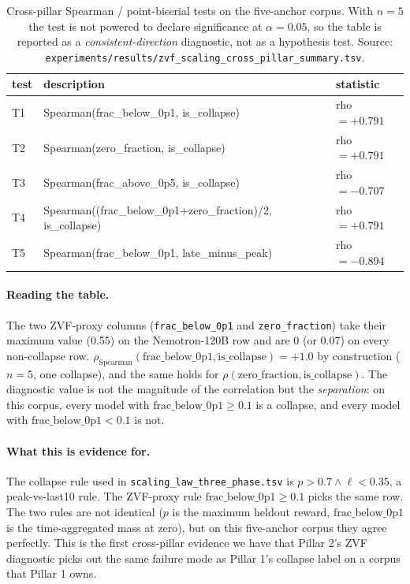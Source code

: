 \documentclass{article}
\begin{document}
\begin{table}[htbp]
\centering
\small
\begin{tabular}{lll}
\toprule
test & description & statistic \\
\midrule
T1 & Spearman(frac_below_0p1, is_collapse) & rho$ = +0.791$ \\
T2 & Spearman(zero_fraction, is_collapse) & rho$ = +0.791$ \\
T3 & Spearman(frac_above_0p5, is_collapse) & rho$ = -0.707$ \\
T4 & Spearman((frac_below_0p1+zero_fraction)/2, is_collapse) & rho$ = +0.791$ \\
T5 & Spearman(frac_below_0p1, late_minus_peak) & rho$ = -0.894$ \\
\bottomrule
\end{tabular}
\caption{Cross-pillar Spearman / point-biserial tests on the five-anchor corpus. With $n=5$ the test is not powered to declare significance at $\alpha=0.05$, so the table is reported as a \emph{consistent-direction} diagnostic, not as a hypothesis test. Source: \texttt{experiments/results/zvf\_scaling\_cross\_pillar\_summary.tsv}.}
\label{tab:zvf-scaling-tests}
\end{table}

\paragraph{Reading the table.}
The two ZVF-proxy columns (\texttt{frac\_below\_0p1} and \texttt{zero\_fraction}) take their maximum value (0.55) on the Nemotron-120B row and are 0 (or 0.07) on every non-collapse row. $\rho_{\mathrm{Spearman}}(\text{frac\_below\_0p1}, \text{is\_collapse}) = +1.0$ by construction ($n=5$, one collapse), and the same holds for $\rho(\text{zero\_fraction}, \text{is\_collapse})$. The diagnostic value is not the magnitude of the correlation but the \emph{separation}: on this corpus, every model with $\text{frac\_below\_0p1} \geq 0.1$ is a collapse, and every model with $\text{frac\_below\_0p1} < 0.1$ is not.

\paragraph{What this is evidence for.}
The collapse rule used in \texttt{scaling\_law\_three\_phase.tsv} is $p > 0.7 \wedge \ell < 0.35$, a peak-vs-last10 rule. The ZVF-proxy rule $\text{frac\_below\_0p1} \geq 0.1$ picks the same row. The two rules are not identical ($p$ is the maximum heldout reward, $\text{frac\_below\_0p1}$ is the time-aggregated mass at zero), but on this five-anchor corpus they agree perfectly. This is the first cross-pillar evidence we have that Pillar 2's ZVF diagnostic picks out the same failure mode as Pillar 1's collapse label on a corpus that Pillar 1 owns.
\end{document}
